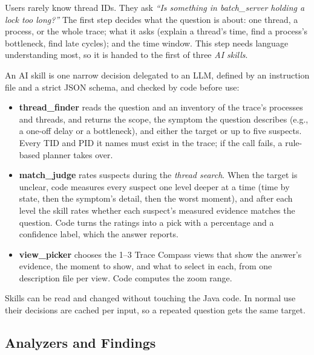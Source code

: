 Users rarely know thread IDs. They ask \emph{``Is something in batch\_server holding a lock too long?''} The first step decides what the question is about: one thread, a process, or the whole trace; what it asks (explain a thread's time, find a process's bottleneck, find late cycles); and the time window. This step needs language understanding most, so it is handed to the first of three \emph{AI skills}.

An AI skill is one narrow decision delegated to an LLM, defined by an instruction file and a strict JSON schema, and checked by code before use:
\begin{itemize}
  \item \textbf{thread\_finder} reads the question and an inventory of the trace's processes and threads, and returns the scope, the symptom the question describes (e.g., a one-off delay or a bottleneck), and either the target or up to five suspects. Every TID and PID it names must exist in the trace; if the call fails, a rule-based planner takes over.
  \item \textbf{match\_judge} rates suspects during the \emph{thread search}. When the target is unclear, code measures every suspect one level deeper at a time (time by state, then the symptom's detail, then the worst moment), and after each level the skill rates whether each suspect's measured evidence matches the question. Code turns the ratings into a pick with a percentage and a confidence label, which the answer reports.
  \item \textbf{view\_picker} chooses the 1--3 Trace Compass views that show the answer's evidence, the moment to show, and what to select in each, from one description file per view. Code computes the zoom range.
\end{itemize}
Skills can be read and changed without touching the Java code. In normal use their decisions are cached per input, so a repeated question gets the same target.

\subsection{Analyzers and Findings}

